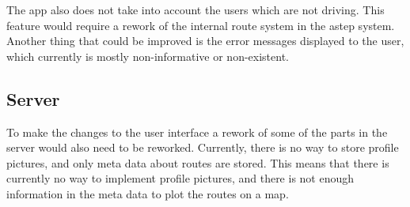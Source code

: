 The app also does not take into account the users which are not driving.
This feature would require a rework of the internal route system in the \gls{astep} system.
Another thing that could be improved is the error messages displayed to the user, which currently is mostly non-informative or non-existent.

\subsection{Server}
To make the changes to the user interface a rework of some of the parts in the server would also need to be reworked.
Currently, there is no way to store profile pictures, and only meta data about routes are stored.
This means that there is currently no way to implement profile pictures, and there is not enough information in the meta data to plot the routes on a map.



